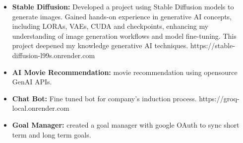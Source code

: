 

\begin{cventries}



 \begin{itemize}
 \item \textbf{Stable Diffusion: } Developed a project using Stable Diffusion models to generate images. Gained hands-on experience in generative AI concepts, including LORAs, VAEs, CUDA and checkpoints, enhancing my understanding of image generation workflows and model fine-tuning. This project deepened my knowledge generative AI techniques. https://stable-diffusion-l99s.onrender.com
 \item  \textbf{AI Movie Recommendation: }movie recommendation using opensource GenAI APIs.
 \item  \textbf{Chat Bot: } Fine tuned bot for company's induction process. https://groq-local.onrender.com
  \item  \textbf{Goal Manager: } created a goal manager with google OAuth to sync short term and long term goals.
  
 \end{itemize}


\end{cventries}
